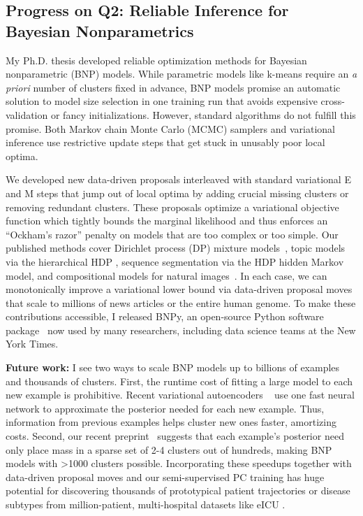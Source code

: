 \documentclass[11pt,letterpaper]{article}
\begin{document}
\vspace{-.3cm}
\subsection*{Progress on Q2: Reliable Inference for Bayesian Nonparametrics}

My Ph.D. thesis developed reliable optimization methods for Bayesian nonparametric (BNP) models. 
While parametric models like k-means require an \emph{a priori} number of clusters fixed in advance,
BNP models promise an automatic solution to model size selection in one training run that avoids expensive cross-validation or fancy initializations. 
However, standard algorithms do not fulfill this promise. Both Markov chain Monte Carlo (MCMC) samplers and variational inference use restrictive update steps that get stuck in unusably poor local optima.

We developed new data-driven proposals interleaved with standard variational E and M steps that jump out of local optima by adding crucial missing clusters or removing redundant clusters. These proposals optimize a variational objective function which tightly bounds the marginal likelihood and thus enforces an ``Ockham's razor'' penalty on models that are too complex or too simple.
Our published methods cover Dirichlet process (DP) mixture models~\citep{hughes2013moVB}, topic models via the hierarchical HDP \citep{hughes2015hdpreliable}, sequence segmentation via the HDP hidden Markov model,
and compositional models for natural images~\citep{ji2017hdpgrid}.
In each case, we can monotonically improve a variational lower bound via data-driven proposal moves that scale to millions of news articles or the entire human genome.
To make these contributions accessible, I released BNPy, an open-source Python software package~\citep{hughes2017bnpy} now used by many researchers, including data science teams at the New York Times.

\textbf{Future work:}
I see two ways to scale BNP models up to billions of examples and thousands of clusters. First, the runtime cost of fitting a large model to each new example is prohibitive. Recent variational autoencoders
~\citep{kingma2014autoencodingVB} use one fast neural network to 
approximate the posterior needed for each new example. Thus, information from previous examples helps cluster new ones faster, amortizing costs. 
Second, our recent preprint~\citep{hughes2016sparse} suggests that each example's posterior need only place mass in a sparse set of 2-4 clusters out of hundreds, making BNP models with \textgreater 1000 clusters possible.
Incorporating these speedups together with data-driven proposal moves and our
semi-supervised PC training has huge potential for 
discovering thousands of prototypical patient trajectories or disease subtypes from million-patient, multi-hospital datasets like eICU \citep{eICU}.
\end{document}
